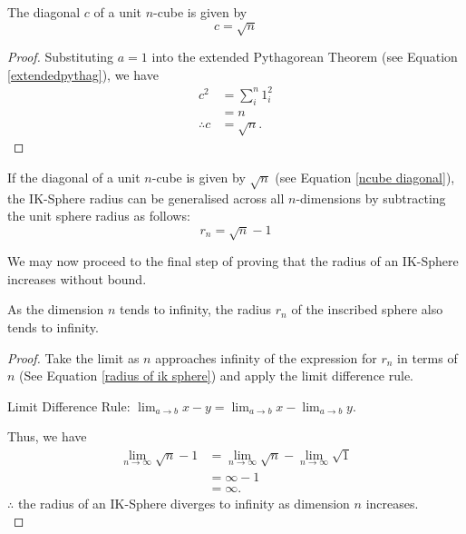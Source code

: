 \begin{corollary} The diagonal $c$ of a unit $n$-cube is given by
\begin{equation} \label{ncube diagonal}
    c = \sqrt{n}
\end{equation}
\end{corollary}
\begin{proof}
    Substituting $a=1$ into the extended Pythagorean Theorem (see Equation \ref{extendedpythag}), we have
    \begin{align*}
        c^2 &= \sum_{i}^{n}1_i^2\\
        &=n\\
        \therefore c &= \sqrt{n}.
    \end{align*}
\end{proof}

If the diagonal of a unit $n$-cube is given by $\sqrt{n}$ (see Equation \ref{ncube diagonal}), the IK-Sphere radius can be generalised across all $n$-dimensions by subtracting the unit sphere radius as follows:
\begin{equation}\label{radius of ik sphere}
    r_n = \sqrt{n}-1
\end{equation}

\noindent
We may now proceed to the final step of proving that the radius of an IK-Sphere increases without bound.

\begin{theorem}\label{theorem:radius of IK-Sphere}
As the dimension $n$ tends to infinity, the radius $r_n$ of the inscribed sphere also tends to infinity.
\end{theorem}
\begin{proof}
Take the limit as $n$ approaches infinity of the expression for $r_n$ in terms of $n$ (See Equation \ref{radius of ik sphere}) and apply the limit difference rule. 

\noindent
Limit Difference Rule: $\lim_{a\to b} x-y =  \lim_{a\to b}x - \lim_{a\to b}y$.

\noindent
Thus, we have
\begin{align*}
    \lim_{n\to\infty} \sqrt{n}-1 &= \lim_{n\to\infty} \sqrt{n} - \lim_{n\to\infty} \sqrt{1}\\
    &=\infty - 1\\
    &=\infty.
\end{align*}
$\therefore$ the radius of an IK-Sphere diverges to infinity as dimension $n$ increases.\\
\end{proof}

